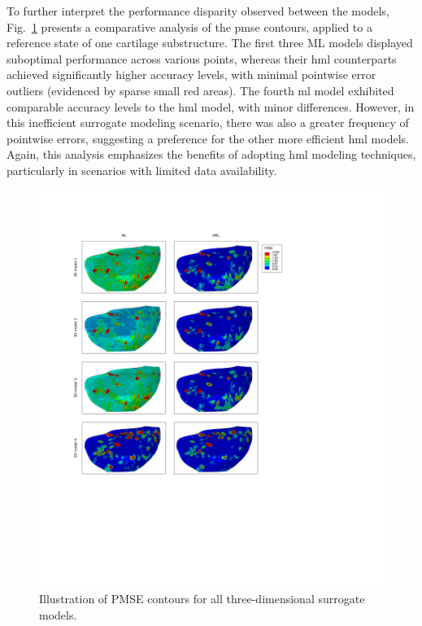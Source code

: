 \documentclass[12pt,a4paper]{report}
\begin{document}
To further interpret the performance disparity observed between the models, Fig.~\ref{fig:visualization} presents a comparative analysis of the \ac{pmse} contours, applied to a reference state of one cartilage substructure. The first three ML models displayed suboptimal performance across various points, whereas their \ac{hml} counterparts achieved significantly higher accuracy levels, with minimal pointwise error outliers (evidenced by sparse small red areas). The fourth \ac{ml} model exhibited comparable accuracy levels to the \ac{hml} model, with minor differences. However, in this inefficient surrogate modeling scenario, there was also a greater frequency of pointwise errors, suggesting a preference for the other more efficient \ac{hml} models. Again, this analysis emphasizes the benefits of adopting \ac{hml} modeling techniques, particularly in scenarios with limited data availability.
%
\begin{figure}[H]\centering
\includegraphics[trim={4.8cm 16.5cm 15cm 5cm},clip,width=1\linewidth,height=0.9\textheight,keepaspectratio]{visualization_3d.pdf}
\caption{Illustration of PMSE contours for all three-dimensional surrogate models.}\label{fig:visualization}
\end{figure}
\end{document}
